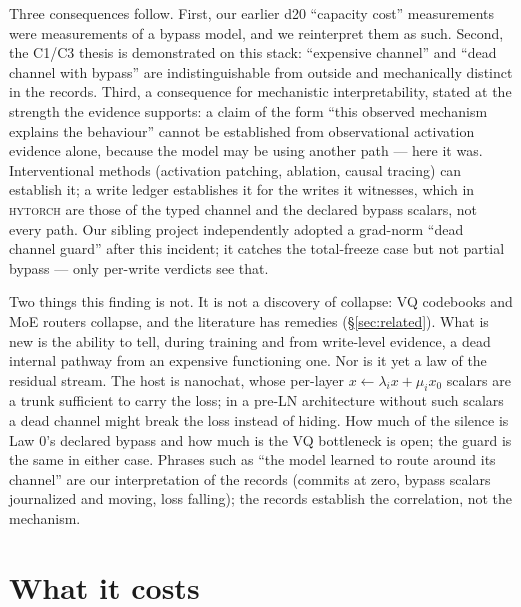 \documentclass[10pt,twocolumn]{article}
\newcommand{\sys}{\textsc{hytorch}}
\begin{document}
Three consequences follow. First, our earlier d20 ``capacity cost''
measurements were measurements of a bypass model, and we reinterpret them as
such. Second, the C1/C3 thesis is demonstrated on this stack: ``expensive
channel'' and ``dead channel with bypass'' are indistinguishable from
outside and mechanically distinct in the records. Third, a consequence for
mechanistic interpretability, stated at the strength the evidence supports:
a claim of the form ``this observed mechanism explains the behaviour''
cannot be established from observational activation evidence alone, because
the model may be using another path --- here it was. Interventional methods
(activation patching, ablation, causal tracing) can establish it; a write
ledger establishes it for the writes it witnesses, which in \sys{} are those
of the typed channel and the declared bypass scalars, not every path. Our
sibling project independently adopted a grad-norm ``dead channel guard''
after this incident; it catches the total-freeze case but not partial
bypass --- only per-write verdicts see that.

Two things this finding is not. It is not a discovery of collapse: VQ
codebooks and MoE routers collapse, and the literature has remedies
(\S\ref{sec:related}). What is new is the ability to tell, during training
and from write-level evidence, a dead internal pathway from an expensive
functioning one. Nor is it yet a law of the residual stream. The host is
nanochat, whose per-layer $x \leftarrow \lambda_i x + \mu_i x_0$ scalars are
a trunk sufficient to carry the loss; in a pre-LN architecture without such
scalars a dead channel might break the loss instead of hiding. How much of
the silence is Law 0's declared bypass and how much is the VQ bottleneck is
open; the guard is the same in either case. Phrases such as ``the model
learned to route around its channel'' are our interpretation of the records
(commits at zero, bypass scalars journalized and moving, loss falling); the
records establish the correlation, not the mechanism.

\section{What it costs}
\label{sec:price}
\end{document}
